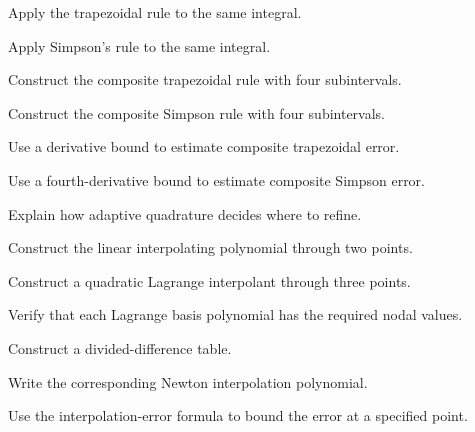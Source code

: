 \begin{exercise}[2]
Apply the trapezoidal rule to the same integral.
\end{exercise}

\begin{exercise}[2]
Apply Simpson's rule to the same integral.
\end{exercise}

\begin{exercise}[3]
Construct the composite trapezoidal rule with four subintervals.
\end{exercise}

\begin{exercise}[3]
Construct the composite Simpson rule with four subintervals.
\end{exercise}

\begin{exercise}[3]
Use a derivative bound to estimate composite trapezoidal error.
\end{exercise}

\begin{exercise}[3]
Use a fourth-derivative bound to estimate composite Simpson error.
\end{exercise}

\begin{exercise}[3]
Explain how adaptive quadrature decides where to refine.
\end{exercise}

\begin{exercise}[2]
Construct the linear interpolating polynomial through two points.
\end{exercise}

\begin{exercise}[3]
Construct a quadratic Lagrange interpolant through three points.
\end{exercise}

\begin{exercise}[3]
Verify that each Lagrange basis polynomial has the required nodal values.
\end{exercise}

\begin{exercise}[3]
Construct a divided-difference table.
\end{exercise}

\begin{exercise}[3]
Write the corresponding Newton interpolation polynomial.
\end{exercise}

\begin{exercise}[3]
Use the interpolation-error formula to bound the error at a specified
point.
\end{exercise}

